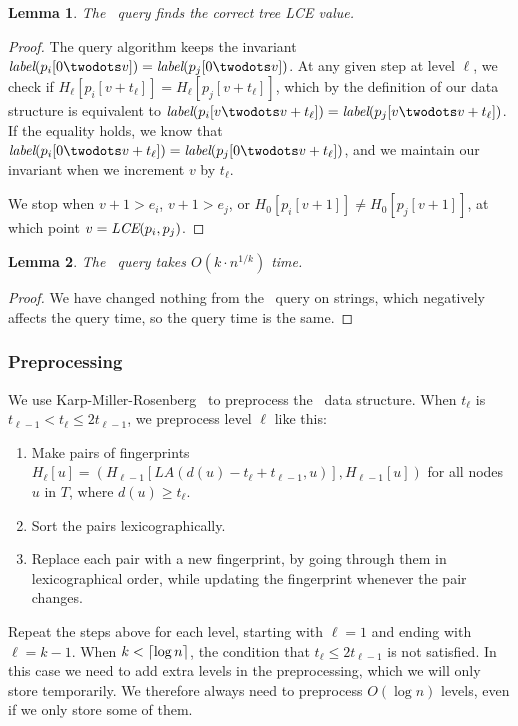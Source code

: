 \documentclass[a4]{article}
\newtheorem{lemma}{Lemma}
\begin{document}
\begin{lemma}
The \tfprintk\ query finds the correct tree LCE value.
\end{lemma}
\begin{proof}
The query algorithm keeps the invariant $\zlabel(p_i[0\twodots v])=\zlabel(p_j[0\twodots v])$. At any given step at level $\ell$, we check if $H_\ell[p_i[v+t_\ell]]=H_\ell[p_j[v+t_\ell]]$, which by the definition of our data structure is equivalent to $\zlabel(p_i[v\twodots v+t_\ell])=\zlabel(p_j[v\twodots v+t_\ell])$. If the equality holds, we know that $\zlabel(p_i[0\twodots v+t_\ell])=\zlabel(p_j[0\twodots v+t_\ell])$, and we maintain our invariant when we increment $v$ by $t_\ell$.

We stop when $v+1>e_i$, $v+1>e_j$, or $H_0[p_i[v+1]] \neq H_0[p_j[v+1]]$, at which point $v=\textit{LCE}(p_i,p_j)$.
\end{proof}

\begin{lemma}
The \tfprintk\ query takes $O(k\cdot n^{1/k})$ time.
\end{lemma}
\begin{proof}
We have changed nothing from the \fprintk\ query on strings, which negatively affects the query time, so the query time is the same.
\end{proof}

\subsubsection{Preprocessing}

We use Karp-Miller-Rosenberg~\cite{karp-miller-rosenberg} to preprocess the \tfprintk\ data structure. When $t_\ell$ is $t_{\ell-1} < t_\ell \leq 2t_{\ell-1}$, we preprocess level $\ell$ like this:
\begin{enumerate}
\item Make pairs of fingerprints $H_\ell[u] = (H_{\ell-1}[LA(d(u)-t_\ell+t_{\ell-1},u)], H_{\ell-1}[u])$ for all nodes $u$ in $T$, where $d(u) \geq t_\ell$.
\item Sort the pairs lexicographically.
\item Replace each pair with a new fingerprint, by going through them in lexicographical order, while updating the fingerprint whenever the pair changes.
\end{enumerate}

Repeat the steps above for each level, starting with $\ell = 1$ and ending with $\ell = k-1$. When $k < \lceil\log n\rceil$, the condition that $t_\ell \leq 2t_{\ell-1}$ is not satisfied. In this case we need to add extra levels in the preprocessing, which we will only store temporarily. We therefore always need to preprocess $O(\log n)$ levels, even if we only store some of them.
\end{document}
